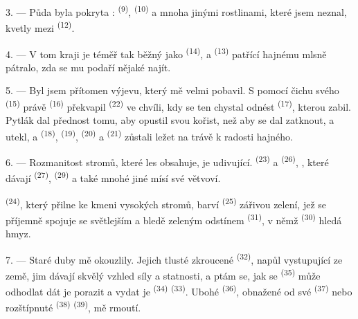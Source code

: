 3. --- Půda byla pokryta : 
\textsuperscript{(9)},  \textsuperscript{(10)} a mnoha jinými rostlinami, které
jsem neznal, kvetly mezi  \textsuperscript{(12)}.

4. --- V tom kraji je  téměř tak běžný jako 
\textsuperscript{(14)}, a  \textsuperscript{(13)} patřící hajnému mlsně pátralo,
zda se mu podaří nějaké najít.

\VUsaut{3.0mm}
\VUsaut{3.0mm}

5. --- Byl jsem přítomen  výjevu, který mě velmi pobavil. S pomocí čichu svého
 \textsuperscript{(15)} právě  \textsuperscript{(16)}
překvapil  \textsuperscript{(22)} ve chvíli, kdy se ten chystal odnést
 \textsuperscript{(17)}, kterou zabil. Pytlák dal přednost tomu, aby opustil svou
kořist, než aby se dal zatknout, a utekl, a
 \textsuperscript{(18)},  \textsuperscript{(19)},
 \textsuperscript{(20)} a  \textsuperscript{(21)} zůstali
ležet na trávě k radosti hajného.

6. --- Rozmanitost stromů, které les obsahuje, je udivující. 
\textsuperscript{(23)} a  \textsuperscript{(26)}, , které
dávají  \textsuperscript{(27)},  \textsuperscript{(29)} a také
mnohé jiné mísí své větvoví.

 \textsuperscript{(24)}, který přilne ke kmeni vysokých stromů, barví
 \textsuperscript{(25)} zářivou zelení, jež se příjemně spojuje se
světlejším a bledě zeleným odstínem  \textsuperscript{(31)}, v němž
 \textsuperscript{(30)} hledá hmyz.

\VUsaut{3.0mm}
\VUsaut{3.0mm}

7. --- Staré duby mě okouzlily. Jejich tlusté zkroucené 
\textsuperscript{(32)}, napůl vystupující ze země, jim dávají skvělý vzhled síly a statnosti,
a ptám se, jak se  \textsuperscript{(35)} může odhodlat dát je porazit a vydat
je  \textsuperscript{(34)}  \textsuperscript{(33)}. Ubohé
 \textsuperscript{(36)}, obnažené od své
 \textsuperscript{(37)} nebo rozštípnuté 
\textsuperscript{(38)}  \textsuperscript{(39)}, mě rmoutí.

